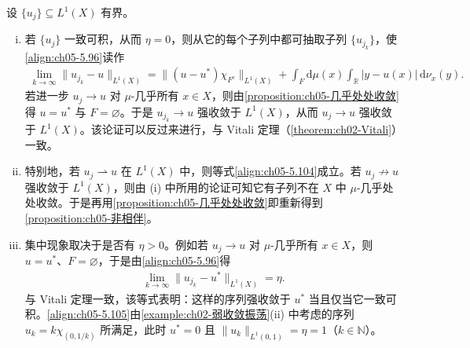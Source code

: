 \documentclass[../../main.tex]{subfiles}
\begin{document}
\begin{remark}\label{remark:ch05-biting一致可积}
设 $\{u_j\}\subseteq L^1(X)$ 有界。
\begin{enumerate}[(i)]
\item 若 $\{u_j\}$ 一致可积，从而 $\eta=0$，则从它的每个子列中都可抽取子列 $\{u_{j_k}\}$，使\eqref{align:ch05-5.96}读作
\begin{align}
\lim_{k\to\infty}\|u_{j_k}-u\|_{L^1(X)}
=\big\|(u-u^*)\chi_{F^c}\big\|_{L^1(X)}
+\int_F\mathrm{d}\mu(x)\int_{\mathbb{R}}|y-u(x)|\,\mathrm{d}\nu_x(y).\label{align:ch05-5.104}
\end{align}
若进一步 $u_j\to u$ 对 $\mu$-几乎所有 $x\in X$，则由\cref{proposition:ch05-几乎处处收敛}得 $u=u^*$ 与 $F=\varnothing$。于是 $u_{j_k}\to u$ 强收敛于 $L^1(X)$，从而 $u_j\to u$ 强收敛于 $L^1(X)$。该论证可以反过来进行，与 Vitali 定理（\cref{theorem:ch02-Vitali}）一致。

\item 特别地，若 $u_j\rightharpoonup u$ 在 $L^1(X)$ 中，则等式\eqref{align:ch05-5.104}成立。若 $u_j\not\to u$ 强收敛于 $L^1(X)$，则由 (i) 中所用的论证可知它有子列不在 $X$ 中 $\mu$-几乎处处收敛。于是再用\cref{proposition:ch05-几乎处处收敛}即重新得到\cref{proposition:ch05-非相伴}。

\item 集中现象取决于是否有 $\eta>0$。例如若 $u_j\to u$ 对 $\mu$-几乎所有 $x\in X$，则 $u=u^*$、$F=\varnothing$，于是由\eqref{align:ch05-5.96}得
\begin{align}
\lim_{k\to\infty}\|u_{j_k}-u^*\|_{L^1(X)}=\eta.\label{align:ch05-5.105}
\end{align}
与 Vitali 定理一致，该等式表明：这样的序列强收敛于 $u^*$ 当且仅当它一致可积。\eqref{align:ch05-5.105}由\cref{example:ch02-弱收敛振荡}(ii) 中考虑的序列 $u_k=k\chi_{(0,1/k)}$ 所满足，此时 $u^*=0$ 且 $\|u_k\|_{L^1(0,1)}=\eta=1$（$k\in\mathbb{N}$）。
\end{enumerate}
\end{remark}
\end{document}
